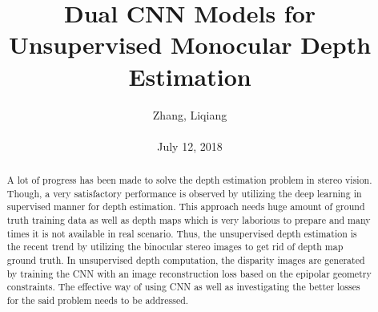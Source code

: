 \documentclass[10pt,twocolumn,letterpaper]{article}
\title{\textbf{Dual CNN Models for Unsupervised Monocular Depth Estimation}}
\author{Zhang, Liqiang\\\\July 12, 2018}
\begin{document}
\maketitle
\par
\begin{abstract}
A lot of progress has been made to solve the depth estimation problem in stereo vision. Though, a very satisfactory performance is observed by utilizing the deep learning in supervised manner for depth estimation. This approach needs huge amount of ground truth training data as well as depth maps which is very laborious to prepare and many times it is not available in real scenario. Thus, the unsupervised depth estimation is the recent trend by utilizing the binocular stereo images to get rid of depth map ground truth. In unsupervised depth computation, the disparity images are generated by training the CNN with an image
reconstruction loss based on the epipolar geometry constraints. The effective way of using CNN as well as investigating the better losses for the said problem needs to be addressed. 
\end{abstract}
\end{document}
